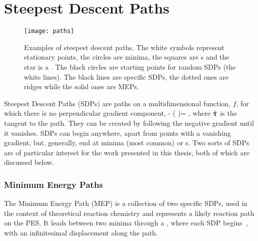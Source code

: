 \section{Steepest Descent Paths}
\label{sec:sdps}

\begin{figure}[h]
  \begin{center}
    \texttt{[image: paths]}
    \parbox{0.85\linewidth}{
      \caption{Examples of steepest descent paths.
The white symbols represent stationary points, the circles are minima, the squares are s and the star is a .
The black circles are starting points for random SDPs (the white lines).
The black lines are specific SDPs, the dotted ones are ridges while the solid ones are MEPs.
      }
      \label{fig:paths}
    }
  \end{center}
\end{figure}

Steepest Descent Paths (SDPs) are paths on a multidimensional function, $f$, for which there is no perpendicular gradient component,
\nabla {} - (\nabla {} \cdot \uvt)\uvt = ,
\eeq
where $\hat{{\mathrm{\mathbf{\bm{\uptau}}}}}$ is the tangent to the path.
They can be created by following the negative gradient until it vanishes.
SDPs can begin anywhere, apart from points with a vanishing gradient, but, generally, end at minima (most common) or \sap{}s.
Two sorts of SDPs are of particular interest for the work presented in this thesis, both of which are discussed below.


\subsubsection{Minimum Energy Paths}


The Minimum Energy Path (MEP) is a collection of two specific SDPs, used in the context of theoretical reaction chemistry and represents a likely reaction path on the PES.
It leads between two minima through a , where each SDP begins~\cite{neb-polemic-henkelman1}, with an infinitesimal displacement along the path.

